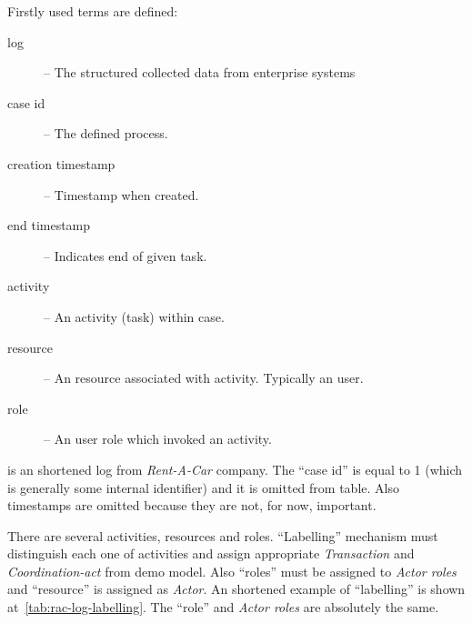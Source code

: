 Firstly used terms are defined:
\begin{description}
\item[log] -- The structured collected data from enterprise systems
\item[case id] -- The defined process.
\item[creation timestamp] -- Timestamp when created.
\item[end timestamp] -- Indicates end of given task.
\item[activity] -- An activity (task) within case.
\item[resource] -- An resource associated with activity. Typically an user.
\item[role] -- An user role which invoked an activity.
\end{description}

 is an shortened log from \textit{Rent-A-Car} company. The ``case id'' is equal to 1 (which is generally some internal identifier) and it is omitted from table. Also timestamps are omitted because they are not, for now, important.  

There are several activities, resources and roles. ``Labelling'' mechanism must distinguish each one of activities and assign appropriate \textit{Transaction} and \textit{Coordination-act} from \gls{demo} model. Also ``roles'' must be assigned to \textit{Actor roles} and ``resource'' is assigned as \textit{Actor}. An shortened example of ``labelling'' is shown at~\cref{tab:rac-log-labelling}. The ``role'' and \textit{Actor roles} are absolutely the same. 

